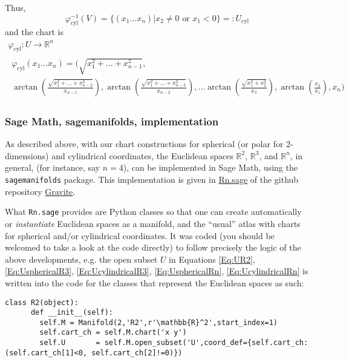 \documentclass[10pt, twoside]{amsart}
\begin{document}
\begin{multicols*}{2}
Thus,
\begin{equation}\label{Eq:UcylindricalRn}
\varphi_{\text{cyl}}^{-1}(V) = \lbrace (x_1 \dots x_n) | x_2 \neq 0 \text{ or } x_1 < 0 \rbrace =: U_{\text{cyl}}
\end{equation}
and the chart is 
\[
\begin{gathered}
  \varphi_{\text{cyl}} : U \to \mathbb{R}^n \\ 
\begin{gathered}
  \varphi_{\text{cyl}}(x_1 \dots x_n) = ( \sqrt{ x_1^2 + \dots + x^2_{n-1} }, \\
  \arctan{ \left( \frac{\sqrt{ x_1^2 + \dots + x_{n-2}^2}}{x_{n-1}} \right) } , \arctan{ \left( \frac{\sqrt{ x_1^2 + \dots + x_{n-3}^2}}{x_{n-2}}  \right) } , \dots \arctan{ \left( \frac{ \sqrt{ x_1^2 + x_2^2 } }{ x_3} \right)} , \arctan{ \left( \frac{x_2}{x_1} \right) }, x_n )
\end{gathered}
\end{gathered}
\]

\subsubsection{Sage Math, sagemanifolds, implementation}

As described above, with our chart constructions for spherical (or polar for 2-dimensions) and cylindrical coordinates, the Euclidean spaces $\mathbb{R}^2$, $\mathbb{R}^3$, and $\mathbb{R}^n$, in general, (for instance, say $n=4$), can be implemented in Sage Math, using the \verb|sagemanifolds| package.  This implementation is given in \href{https://github.com/ernestyalumni/Gravite/blob/master/Rn.sage}{Rn.sage} of the github repository \href{https://github.com/ernestyalumni/Gravite}{Gravite}.  

What \verb|Rn.sage| provides are Python classes so that one can create automatically or \emph{instantiate} Euclidean spaces as a manifold, and the ``usual'' atlas with charts for spherical and/or cylindrical coordinates.  It was coded (you should be welcomed to take a look at the code directly) to follow precisely the logic of the above developments, e.g. the open subset $U$ in Equations \ref{Eq:UR2}, \ref{Eq:UsphericalR3}, \ref{Eq:UcylindricalR3}, \ref{Eq:UsphericalRn}, \ref{Eq:UcylindricalRn} is written into the code for the classes that represent the Euclidean spaces as such:
\begin{lstlisting}
class R2(object):
      def __init__(self):
        self.M = Manifold(2,'R2',r'\mathbb{R}^2',start_index=1)
        self.cart_ch = self.M.chart('x y')
        self.U       = self.M.open_subset('U',coord_def={self.cart_ch: (self.cart_ch[1]<0, self.cart_ch[2]!=0)})


\end{lstlisting}
\end{multicols*}
\end{document}
